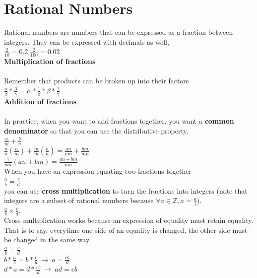 \documentclass[12pt]{report}
\begin{document}
\section{Rational Numbers}
Rational numbers are numbers that can be expressed as a fraction between integers. They can be expressed with decimals as well,\smallskip\\
$\frac{2}{10} = 0.2$,\hspace{10pt}$\frac{2}{100} = 0.02$\bigskip\\
\textbf{Multiplication of fractions}\bigskip\\
\fbox{$\frac{\alpha}{\beta}*\frac{\gamma}{\phi}=\frac{\alpha \gamma}{\beta \phi}$}\hspace{10pt}\fbox{$\frac{\alpha}{\beta}*\frac{\beta}{\gamma}=\frac{\alpha}{\gamma}$}\bigskip\\
Remember that products can be broken up into their factors\smallskip\\
$\frac{\alpha}{\beta}*\frac{\beta}{\gamma}= \alpha * \frac{1}{\beta} * \beta * \frac{1}{\gamma}$\bigskip\\
\textbf{Addition of fractions}\bigskip\\
\bigskip\\
In practice, when you want to add fractions together, you want a \textbf{common denominator} so that you can use the distributive property.\smallskip\\
$\frac{a}{m} + \frac{b}{n}$\smallskip\\
$\frac{n}{n}(\frac{a}{m}) + \frac{m}{m}(\frac{b}{n})=\frac{an}{mn}+\frac{bm}{mn}$\smallskip\\
$\frac{1}{mn}(an + bm)=\frac{an+bm}{mn}$\bigskip\\
When you have an expression equating two fractions together\smallskip\\
$\frac{a}{b} = \frac{c}{d}$\smallskip\\
you can use \textbf{cross multiplication} to turn the fractions into integers (note that integers are a subset of rational numbers because $\forall a \in \mathbb{Z}, a=\frac{a}{1}$).\smallskip\\
$\frac{a}{b} \times \frac{c}{d}$,\hspace{10pt}\\

Cross multiplication works because an expression of equality must retain equality. That is to say, everytime one side of an equality is changed, the other side must be changed in the same way.\smallskip\\
$\frac{a}{b}=\frac{c}{d}$\smallskip\\
$b*\frac{a}{b}=b*\frac{c}{d}~\rightarrow~a=\frac{cb}{d}$\smallskip\\
$d*a=d*\frac{cb}{d}~\rightarrow~ad=cb$\bigskip
\end{document}
